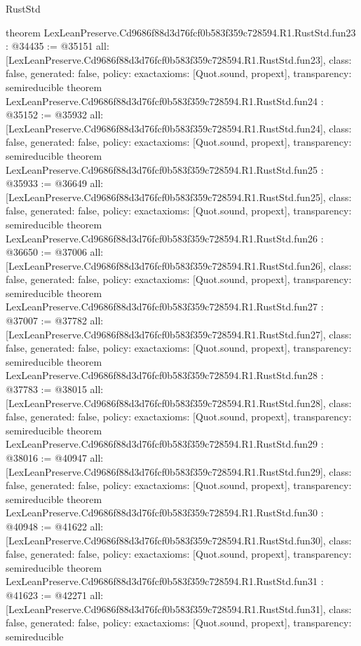 \begin{lexlean}{RustStd}
\begin{coremodule}
{}
theorem LexLeanPreserve.Cd9686f88d3d76fcf0b583f359c728594.R1.RustStd.fun23 : @34435 := @35151 {
  all: [LexLeanPreserve.Cd9686f88d3d76fcf0b583f359c728594.R1.RustStd.fun23],
  class: false,
  generated: false,
  policy: exact{axioms: [Quot.sound, propext]},
  transparency: semireducible
}
theorem LexLeanPreserve.Cd9686f88d3d76fcf0b583f359c728594.R1.RustStd.fun24 : @35152 := @35932 {
  all: [LexLeanPreserve.Cd9686f88d3d76fcf0b583f359c728594.R1.RustStd.fun24],
  class: false,
  generated: false,
  policy: exact{axioms: [Quot.sound, propext]},
  transparency: semireducible
}
theorem LexLeanPreserve.Cd9686f88d3d76fcf0b583f359c728594.R1.RustStd.fun25 : @35933 := @36649 {
  all: [LexLeanPreserve.Cd9686f88d3d76fcf0b583f359c728594.R1.RustStd.fun25],
  class: false,
  generated: false,
  policy: exact{axioms: [Quot.sound, propext]},
  transparency: semireducible
}
theorem LexLeanPreserve.Cd9686f88d3d76fcf0b583f359c728594.R1.RustStd.fun26 : @36650 := @37006 {
  all: [LexLeanPreserve.Cd9686f88d3d76fcf0b583f359c728594.R1.RustStd.fun26],
  class: false,
  generated: false,
  policy: exact{axioms: [Quot.sound, propext]},
  transparency: semireducible
}
theorem LexLeanPreserve.Cd9686f88d3d76fcf0b583f359c728594.R1.RustStd.fun27 : @37007 := @37782 {
  all: [LexLeanPreserve.Cd9686f88d3d76fcf0b583f359c728594.R1.RustStd.fun27],
  class: false,
  generated: false,
  policy: exact{axioms: [Quot.sound, propext]},
  transparency: semireducible
}
theorem LexLeanPreserve.Cd9686f88d3d76fcf0b583f359c728594.R1.RustStd.fun28 : @37783 := @38015 {
  all: [LexLeanPreserve.Cd9686f88d3d76fcf0b583f359c728594.R1.RustStd.fun28],
  class: false,
  generated: false,
  policy: exact{axioms: [Quot.sound, propext]},
  transparency: semireducible
}
theorem LexLeanPreserve.Cd9686f88d3d76fcf0b583f359c728594.R1.RustStd.fun29 : @38016 := @40947 {
  all: [LexLeanPreserve.Cd9686f88d3d76fcf0b583f359c728594.R1.RustStd.fun29],
  class: false,
  generated: false,
  policy: exact{axioms: [Quot.sound, propext]},
  transparency: semireducible
}
theorem LexLeanPreserve.Cd9686f88d3d76fcf0b583f359c728594.R1.RustStd.fun30 : @40948 := @41622 {
  all: [LexLeanPreserve.Cd9686f88d3d76fcf0b583f359c728594.R1.RustStd.fun30],
  class: false,
  generated: false,
  policy: exact{axioms: [Quot.sound, propext]},
  transparency: semireducible
}
theorem LexLeanPreserve.Cd9686f88d3d76fcf0b583f359c728594.R1.RustStd.fun31 : @41623 := @42271 {
  all: [LexLeanPreserve.Cd9686f88d3d76fcf0b583f359c728594.R1.RustStd.fun31],
  class: false,
  generated: false,
  policy: exact{axioms: [Quot.sound, propext]},
  transparency: semireducible
}
\end{coremodule}
\end{lexlean}
